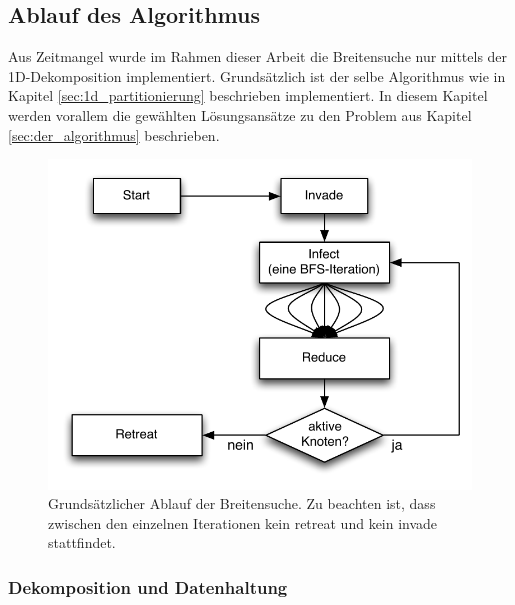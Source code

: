 \subsection{Ablauf des Algorithmus} %
\label{sub:ablauf_des_algorithmus}
Aus Zeitmangel wurde im Rahmen dieser Arbeit die Breitensuche nur mittels der 1D-Dekomposition implementiert. Grundsätzlich ist der selbe Algorithmus wie in Kapitel \ref{sec:1d_partitionierung} beschrieben implementiert. In diesem Kapitel werden vorallem die gewählten Lösungsansätze zu den Problem aus Kapitel \ref{sec:der_algorithmus} beschrieben.
\begin{figure}[ht]
	\centering
	\label{img:invasive-flow}
	\includegraphics{pics/invasive-flow.pdf}
	\caption{Grundsätzlicher Ablauf der Breitensuche. Zu beachten ist, dass zwischen den einzelnen Iterationen kein retreat und kein invade stattfindet.}
\end{figure}

\subsubsection{Dekomposition und Datenhaltung} %
\label{ssub:dekomposition_und_datenhaltung}

